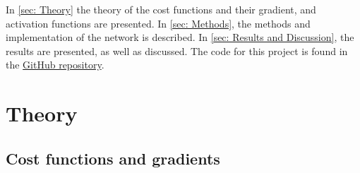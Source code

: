\documentclass[reprint,english,notitlepage, floatfix]{revtex4-2}  %
\begin{document}
    In \autoref{sec: Theory} the theory of the cost functions and their gradient, and activation functions are presented. In \autoref{sec: Methods}, the methods and implementation of the network is described. In \autoref{sec: Results and Discussion}, the results are presented, as well as discussed. The code for this project is found in the \href{https://github.com/nillescorner/FYS-STK4155-Group/tree/main/Project_2}{GitHub repository}. 
    

\section{Theory} \label{sec: Theory}

\subsection{Cost functions and gradients}
\end{document}
